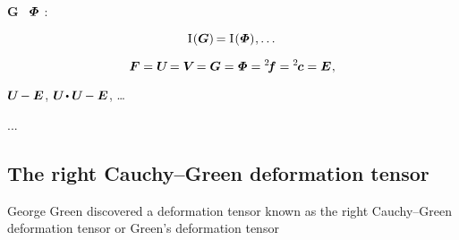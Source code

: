 $\bm{G}$
~$\mathboldPhi$
:

\nopagebreak
\begin{equation*}
\anyfirstinvariantof{\bm{G}}
\hspace{-0.2ex}
= \anyfirstinvariantof{\mathboldPhi}
\hspace{.1ex} , \dots
\end{equation*}


\nopagebreak\vspace{-0.2em}\begin{equation*}
\bm{F} = \bm{U} \hspace{-0.3ex} = \bm{V} \hspace{-0.3ex} = \bm{G} = \mathboldPhi = {^2}\hspace{-0.4ex}\bm{f} = {^2}\hspace{-0.2ex}\bm{c} = \UnitDyad
\hspace{.1ex}
,
\end{equation*}

\vspace{-0.2em}\noindent
{}
${\bm{U} \hspace{-0.2ex} - \bm{E}}$,
${\bm{U} \hspace{-0.3ex} \dotp \bm{U} \hspace{-0.2ex} - \UnitDyad}$, \dots

...

\subsection*{The right Cauchy\hbox{--}Green deformation tensor}

George Green discovered a deformation tensor known as the right Cauchy\hbox{--}Green deformation tensor or Green’s deformation tensor

